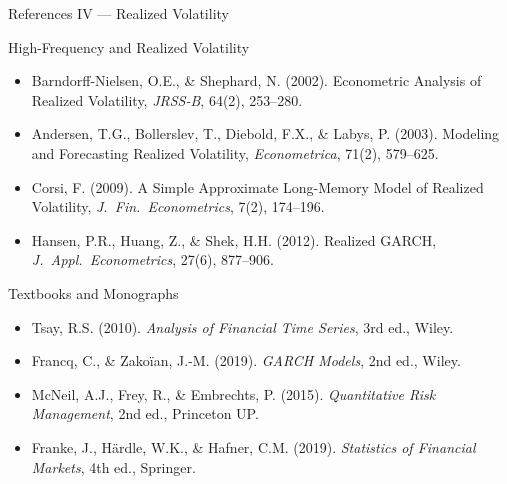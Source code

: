 \documentclass[9pt, aspectratio=169, t]{beamer}
\begin{document}
\begin{frame}{References IV --- Realized Volatility}
    \vspace{-0.4cm}
    \begin{block}{High-Frequency and Realized Volatility}
        {\small
        \begin{itemize}\setlength{\itemsep}{-1pt}
            \item Barndorff-Nielsen, O.E., \& Shephard, N. (2002). Econometric Analysis of Realized Volatility, \textit{JRSS-B}, 64(2), 253--280.
            \item Andersen, T.G., Bollerslev, T., Diebold, F.X., \& Labys, P. (2003). Modeling and Forecasting Realized Volatility, \textit{Econometrica}, 71(2), 579--625.
            \item Corsi, F. (2009). A Simple Approximate Long-Memory Model of Realized Volatility, \textit{J.\ Fin.\ Econometrics}, 7(2), 174--196.
            \item Hansen, P.R., Huang, Z., \& Shek, H.H. (2012). Realized GARCH, \textit{J.\ Appl.\ Econometrics}, 27(6), 877--906.
        \end{itemize}
        }
    \end{block}
    \vspace{-0.15cm}
    \begin{exampleblock}{Textbooks and Monographs}
        {\small
        \begin{itemize}\setlength{\itemsep}{-1pt}
            \item Tsay, R.S. (2010). \textit{Analysis of Financial Time Series}, 3rd ed., Wiley.
            \item Francq, C., \& Zakoïan, J.-M. (2019). \textit{GARCH Models}, 2nd ed., Wiley.
            \item McNeil, A.J., Frey, R., \& Embrechts, P. (2015). \textit{Quantitative Risk Management}, 2nd ed., Princeton UP.
            \item Franke, J., Härdle, W.K., \& Hafner, C.M. (2019). \textit{Statistics of Financial Markets}, 4th ed., Springer.
        \end{itemize}
        }
    \end{exampleblock}
\end{frame}
\end{document}
